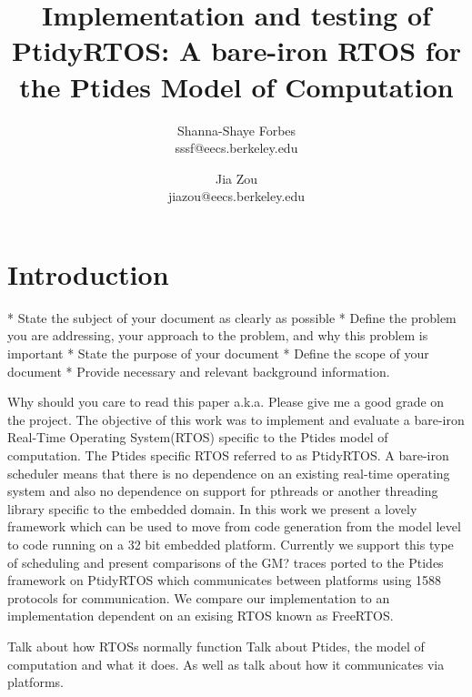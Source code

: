 \documentclass{sig-alternate}
\begin{document}
\title{Implementation and testing of PtidyRTOS: A bare-iron RTOS for the Ptides Model of Computation}





\author{Shanna-Shaye Forbes\\
sssf@eecs.berkeley.edu\\
\and
Jia Zou\\
jiazou@eecs.berkeley.edu\\
}

\maketitle
\begin{abstract}

\end{abstract}

\section{Introduction}
* State the subject of your document as clearly as possible
* Define the problem you are addressing, your approach to the problem, and why this problem is important
* State the purpose of your document
* Define the scope of your document
* Provide necessary and relevant background information.

Why should you care to read this paper a.k.a. Please give me a good grade on the project.
The objective of this work was to implement and evaluate a bare-iron Real-Time Operating System(RTOS) specific to the Ptides model of computation. The Ptides specific RTOS referred to as PtidyRTOS. A bare-iron scheduler means that there is no dependence on an existing real-time operating system and also no dependence on support for pthreads or another threading library specific to the embedded domain.
In this work we present a lovely framework which can be used to move from code generation from the model level to code running on a 32 bit embedded platform. Currently we support this type of scheduling and present comparisons of the GM? traces ported to the Ptides framework on PtidyRTOS which communicates between platforms using 1588 protocols for communication. We compare our implementation to an implementation dependent on an exising RTOS known as FreeRTOS.


Talk about how RTOSs normally function
Talk about Ptides, the model of computation and what it does. As well as talk about how it communicates via platforms.
\end{document}
